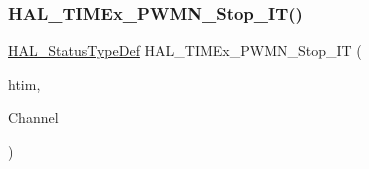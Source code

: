\subsubsection{\texorpdfstring{H\+A\+L\+\_\+\+T\+I\+M\+Ex\+\_\+\+P\+W\+M\+N\+\_\+\+Stop\+\_\+\+I\+T()}{HAL\_TIMEx\_PWMN\_Stop\_IT()}}
{\footnotesize\ttfamily \hyperlink{stm32f4xx__hal__def_8h_a63c0679d1cb8b8c684fbb0632743478f}{H\+A\+L\+\_\+\+Status\+Type\+Def} H\+A\+L\+\_\+\+T\+I\+M\+Ex\+\_\+\+P\+W\+M\+N\+\_\+\+Stop\+\_\+\+IT (\begin{DoxyParamCaption}\item[{\hyperlink{struct_t_i_m___handle_type_def}{T\+I\+M\+\_\+\+Handle\+Type\+Def} $\ast$}]{htim,  }\item[{uint32\+\_\+t}]{Channel }\end{DoxyParamCaption})}

